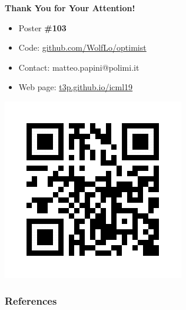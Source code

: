 \documentclass[aspectratio=169, table]{beamer}
\newcommand{\enb}[1]{\textcolor{poliblue1}{\textbf{#1}}}
\begin{document}
\begin{frame}[plain]
\begin{center}
	\huge{\enb{Thank You for Your Attention!}}
\end{center}

\begin{minipage}[]{.5\paperwidth}
	\begin{itemize}
		\item Poster \textbf{\#103}
		\item Code: \url{github.com/WolfLo/optimist}
		\item Contact: matteo.papini@polimi.it
		\item Web page: \url{t3p.github.io/icml19} 
	\end{itemize}
\end{minipage}
\hspace{2cm}%
\begin{minipage}[]{.2\paperwidth}
	\includegraphics[width=\textwidth]{qr.png}
\end{minipage}
\end{frame}


\begin{frame}
\frametitle{References}


\end{frame}

\end{document}

